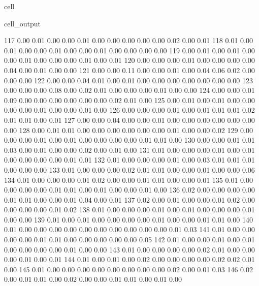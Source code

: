 \documentclass[letterpaper,10pt,english]{jupyterBook}
\begin{document}
\begin{sphinxuseclass}{cell}
\begin{sphinxVerbatimOutput}
\begin{sphinxuseclass}{cell_output}
\begin{sphinxVerbatim}[commandchars=\\\{\}]
       117	0.00 	0.01 	0.00 	0.00 	0.01 	0.00 	0.00 	0.00 	0.00 	0.00 	0.02 	0.00 	0.01
       118	0.01 	0.00 	0.01 	0.00 	0.00 	0.01 	0.00 	0.00 	0.01 	0.00 	0.00 	0.00 	0.00
       119	0.00 	0.01 	0.00 	0.01 	0.00 	0.00 	0.01 	0.00 	0.00 	0.00 	0.01 	0.00 	0.01
       120	0.00 	0.00 	0.00 	0.01 	0.00 	0.00 	0.00 	0.00 	0.04 	0.00 	0.01 	0.00 	0.00
       121	0.00 	0.00 	0.11 	0.00 	0.00 	0.01 	0.00 	0.04 	0.06 	0.02 	0.00 	0.00 	0.00
       122	0.00 	0.00 	0.04 	0.01 	0.00 	0.01 	0.00 	0.00 	0.00 	0.00 	0.00 	0.00 	0.00
       123	0.00 	0.00 	0.00 	0.08 	0.00 	0.02 	0.01 	0.00 	0.00 	0.00 	0.01 	0.00 	0.00
       124	0.00 	0.00 	0.01 	0.09 	0.00 	0.00 	0.00 	0.00 	0.00 	0.00 	0.02 	0.01 	0.00
       125	0.00 	0.01 	0.00 	0.01 	0.00 	0.00 	0.00 	0.00 	0.01 	0.00 	0.00 	0.01 	0.00
       126	0.00 	0.00 	0.00 	0.01 	0.00 	0.01 	0.01 	0.01 	0.02 	0.01 	0.01 	0.00 	0.01
       127	0.00 	0.00 	0.04 	0.00 	0.00 	0.01 	0.00 	0.00 	0.00 	0.00 	0.00 	0.00 	0.00
       128	0.00 	0.01 	0.01 	0.00 	0.00 	0.00 	0.00 	0.00 	0.00 	0.01 	0.00 	0.00 	0.02
       129	0.00 	0.00 	0.00 	0.01 	0.00 	0.01 	0.00 	0.00 	0.00 	0.00 	0.01 	0.01 	0.00
       130	0.00 	0.00 	0.01 	0.01 	0.03 	0.00 	0.01 	0.00 	0.00 	0.02 	0.00 	0.01 	0.00
       131	0.01 	0.00 	0.00 	0.00 	0.01 	0.00 	0.01 	0.00 	0.00 	0.00 	0.00 	0.01 	0.01
       132	0.01 	0.00 	0.00 	0.00 	0.01 	0.00 	0.03 	0.01 	0.01 	0.01 	0.00 	0.00 	0.00
       133	0.01 	0.00 	0.00 	0.00 	0.02 	0.01 	0.01 	0.00 	0.00 	0.01 	0.00 	0.00 	0.06
       134	0.01 	0.00 	0.00 	0.00 	0.01 	0.02 	0.00 	0.00 	0.01 	0.01 	0.00 	0.00 	0.01
       135	0.01 	0.00 	0.00 	0.00 	0.00 	0.01 	0.01 	0.00 	0.01 	0.00 	0.00 	0.01 	0.00
       136	0.02 	0.00 	0.00 	0.00 	0.00 	0.01 	0.01 	0.00 	0.00 	0.01 	0.04 	0.00 	0.01
       137	0.02 	0.00 	0.01 	0.00 	0.00 	0.01 	0.02 	0.00 	0.00 	0.00 	0.00 	0.01 	0.02
       138	0.01 	0.00 	0.00 	0.00 	0.01 	0.00 	0.01 	0.00 	0.00 	0.00 	0.01 	0.00 	0.00
       139	0.01 	0.00 	0.01 	0.00 	0.00 	0.00 	0.00 	0.01 	0.00 	0.00 	0.01 	0.01 	0.00
       140	0.01 	0.00 	0.00 	0.00 	0.00 	0.00 	0.00 	0.00 	0.00 	0.00 	0.00 	0.01 	0.03
       141	0.01 	0.00 	0.00 	0.00 	0.00 	0.01 	0.01 	0.00 	0.00 	0.00 	0.00 	0.00 	0.05
       142	0.01 	0.00 	0.00 	0.01 	0.00 	0.01 	0.00 	0.00 	0.00 	0.00 	0.01 	0.00 	0.00
       143	0.01 	0.00 	0.00 	0.00 	0.00 	0.02 	0.01 	0.00 	0.00 	0.00 	0.01 	0.00 	0.01
       144	0.01 	0.00 	0.01 	0.00 	0.02 	0.00 	0.00 	0.00 	0.00 	0.02 	0.02 	0.01 	0.00
       145	0.01 	0.00 	0.00 	0.00 	0.00 	0.00 	0.00 	0.00 	0.00 	0.02 	0.00 	0.01 	0.03
       146	0.02 	0.00 	0.01 	0.01 	0.00 	0.02 	0.00 	0.00 	0.01 	0.01 	0.00 	0.01 	0.00

\end{sphinxVerbatim}
\end{sphinxuseclass}
\end{sphinxVerbatimOutput}
\end{sphinxuseclass}
\end{document}
